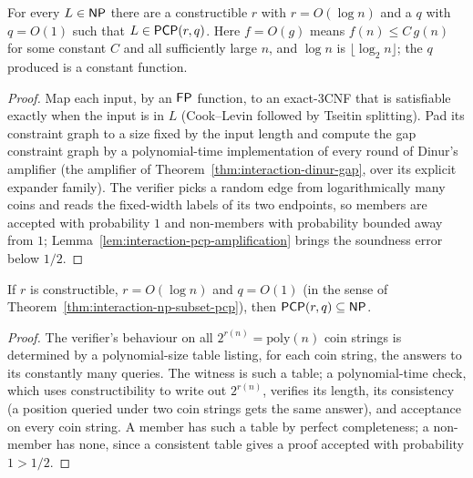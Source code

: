 \begin{theorem}
  \label{thm:interaction-np-subset-pcp}
  \leanok
  For every $L \in \mathsf{NP}$ there are a constructible $r$ with
  $r = O(\log n)$ and a $q$ with $q = O(1)$ such that
  $L \in \mathsf{PCP}(r, q)$. Here $f = O(g)$ means $f(n) \le C\,g(n)$ for some
  constant $C$ and all sufficiently large $n$, and $\log n$ is
  $\lfloor \log_2 n \rfloor$; the $q$ produced is a constant function.
\end{theorem}
\begin{proof}
  \leanok
  Map each input, by an $\mathsf{FP}$ function, to an exact-3CNF that is
  satisfiable exactly when the input is in $L$ (Cook--Levin followed by
  Tseitin splitting). Pad its constraint graph to a size fixed by the input
  length and compute the gap constraint graph by a polynomial-time
  implementation of every round of Dinur's amplifier (the amplifier of
  Theorem~\ref{thm:interaction-dinur-gap}, over its explicit expander
  family). The verifier picks a random edge from logarithmically many coins
  and reads the fixed-width labels of its two endpoints, so members are
  accepted with probability $1$ and non-members with probability bounded
  away from $1$; Lemma~\ref{lem:interaction-pcp-amplification} brings the
  soundness error below $1/2$.
\end{proof}

\begin{theorem}
  \label{thm:interaction-pcp-subset-np}
  \leanok
  If $r$ is constructible, $r = O(\log n)$ and $q = O(1)$ (in the sense of
  Theorem~\ref{thm:interaction-np-subset-pcp}), then
  $\mathsf{PCP}(r, q) \subseteq \mathsf{NP}$.
\end{theorem}
\begin{proof}
  \leanok
  The verifier's behaviour on all $2^{r(n)} = \mathrm{poly}(n)$ coin strings
  is determined by a polynomial-size table listing, for each coin string, the
  answers to its constantly many queries. The witness is such a table; a
  polynomial-time check, which uses constructibility to write out
  $2^{r(n)}$, verifies its length, its consistency (a position queried under
  two coin strings gets the same answer), and acceptance on every coin
  string. A member has such a table by perfect completeness; a non-member has
  none, since a consistent table gives a proof accepted with probability
  $1 > 1/2$.
\end{proof}

